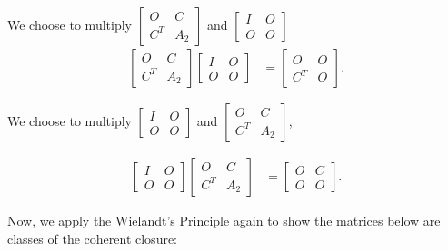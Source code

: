 We choose to multiply $\begin{bmatrix}
        O&C\\C^T&A_2
    \end{bmatrix}$ and $\begin{bmatrix}
        I & O\\O & O
    \end{bmatrix}$
\begin{align*}
    \begin{bmatrix}
        O&C\\C^T&A_2
    \end{bmatrix}
    \begin{bmatrix}
        I & O\\O & O
    \end{bmatrix}
    &= \begin{bmatrix}
        O & O\\C^T & O
    \end{bmatrix}.
\end{align*}

We choose to multiply $\begin{bmatrix}
        I&O\\O&O
    \end{bmatrix}$ and $\begin{bmatrix}
        O&C\\C^T&A_2
    \end{bmatrix}$,
    
\begin{align*}
    \begin{bmatrix}
        I&O\\O&O
    \end{bmatrix}
    \begin{bmatrix}
        O&C\\C^T&A_2
    \end{bmatrix} &=
    \begin{bmatrix}
        O&C\\O&O
    \end{bmatrix}.
\end{align*}

Now, we apply the Wielandt's Principle again to show the matrices below are classes of the coherent closure:

